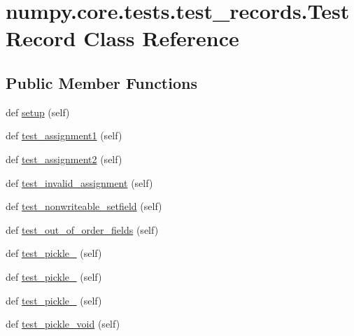 \hypertarget{classnumpy_1_1core_1_1tests_1_1test__records_1_1TestRecord}{}\section{numpy.\+core.\+tests.\+test\+\_\+records.\+Test\+Record Class Reference}
\label{classnumpy_1_1core_1_1tests_1_1test__records_1_1TestRecord}
\subsection*{Public Member Functions}
\begin{DoxyCompactItemize}
\item 
def \hyperlink{classnumpy_1_1core_1_1tests_1_1test__records_1_1TestRecord_a8ccf45bf92a3131b50881440ccf4ece3}{setup} (self)
\item 
def \hyperlink{classnumpy_1_1core_1_1tests_1_1test__records_1_1TestRecord_a7008cf0ba8f2aeaea7c588d1f5c4fe0a}{test\+\_\+assignment1} (self)
\item 
def \hyperlink{classnumpy_1_1core_1_1tests_1_1test__records_1_1TestRecord_a3a4a81f9ae1c3622daafba8f701ad6b1}{test\+\_\+assignment2} (self)
\item 
def \hyperlink{classnumpy_1_1core_1_1tests_1_1test__records_1_1TestRecord_a094564092e8abc1c3595c0712e55e381}{test\+\_\+invalid\+\_\+assignment} (self)
\item 
def \hyperlink{classnumpy_1_1core_1_1tests_1_1test__records_1_1TestRecord_a3097ed0b6dbe5b3c5f12a89ac015f4f8}{test\+\_\+nonwriteable\+\_\+setfield} (self)
\item 
def \hyperlink{classnumpy_1_1core_1_1tests_1_1test__records_1_1TestRecord_a5f62d884b923724f49370f699deda14e}{test\+\_\+out\+\_\+of\+\_\+order\+\_\+fields} (self)
\item 
def \hyperlink{classnumpy_1_1core_1_1tests_1_1test__records_1_1TestRecord_a3aaaa9ced9e6c7a1b975408cfc0a664f}{test\+\_\+pickle\+\_} (self)
\item 
def \hyperlink{classnumpy_1_1core_1_1tests_1_1test__records_1_1TestRecord_a4435f554b5e6edb6bbc41f217ebaa716}{test\+\_\+pickle\+\_} (self)
\item 
def \hyperlink{classnumpy_1_1core_1_1tests_1_1test__records_1_1TestRecord_a6efaaf7c210e7fd2dc1e5d6751e0217a}{test\+\_\+pickle\+\_} (self)
\item 
def \hyperlink{classnumpy_1_1core_1_1tests_1_1test__records_1_1TestRecord_add0c5e0fa5b37dbec465284121ebf94f}{test\+\_\+pickle\+\_\+void} (self)

\end{DoxyCompactItemize}
